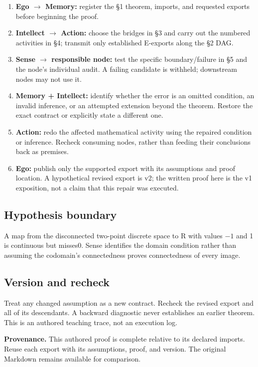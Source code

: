 \documentclass[preprint,12pt,aps,pra,showkeys,amsmath,amssymb,superscriptaddress,floatfix]{revtex4-2}
\theoremstyle{definition}
\theoremstyle{remark}
\providecommand{\tightlist}{\setlength{\itemsep}{2pt}\setlength{\parskip}{0pt}}
\begin{document}
\begin{enumerate}
\def\labelenumi{\arabic{enumi}.}
\tightlist
\item
  \textbf{Ego \(\to\) Memory:} register the §1 theorem, imports, and
  requested exports before beginning the proof.
\item
  \textbf{Intellect \(\to\) Action:} choose the bridges in §3 and carry
  out the numbered activities in §4; transmit only established E-exports
  along the §2 DAG.
\item
  \textbf{Sense \(\to\) responsible node:} test the specific
  boundary/failure in §5 and the node's individual audit. A failing
  candidate is withheld; downstream nodes may not use it.
\item
  \textbf{Memory + Intellect:} identify whether the error is an omitted
  condition, an invalid inference, or an attempted extension beyond the
  theorem. Restore the exact contract or explicitly state a different
  one.
\item
  \textbf{Action:} redo the affected mathematical activity using the
  repaired condition or inference. Recheck consuming nodes, rather than
  feeding their conclusions back as premises.
\item
  \textbf{Ego:} publish only the supported export with its assumptions
  and proof location. A hypothetical revised export is v2; the written
  proof here is the v1 exposition, not a claim that this repair was
  executed.
\end{enumerate}

\subsection{Hypothesis boundary}
A map from the disconnected two-point discrete space to R with values
\(-1\) and 1 is continuous but misses0. Sense identifies the domain
condition rather than assuming the codomain's connectedness proves
connectedness of every image.

\subsection{Version and recheck}
Treat any changed assumption as a new contract. Recheck the revised
export and all of its descendants. A backward diagnostic never
establishes an earlier theorem. This is an authored teaching trace, not
an execution log.

\par\medskip\begingroup\small\linespread{1.0}\selectfont\noindent\textbf{Provenance.} This authored proof is complete relative to its declared imports. Reuse
each export with its assumptions, proof, and version. The original
Markdown remains available for comparison.
\par\endgroup
\end{document}
